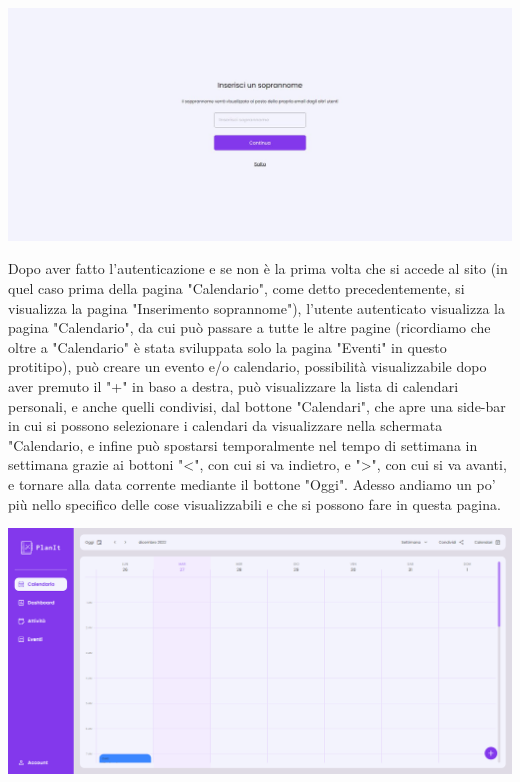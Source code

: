 \begin{center}
    \includegraphics[width=1\textwidth, height=0.3\textheight]{img/png/FrontEnd/InserimentoSoprannome.jpg}
\end{center}

Dopo aver fatto l'autenticazione e se non è la prima volta che si accede al sito (in quel caso prima della pagina "Calendario", come detto precedentemente, si visualizza la pagina "Inserimento soprannome"), l'utente autenticato visualizza la pagina "Calendario", da cui può passare a tutte le altre pagine (ricordiamo che oltre a "Calendario" è stata sviluppata solo la pagina "Eventi" in questo protitipo), può creare un evento  e/o calendario, possibilità visualizzabile dopo aver premuto il "+" in baso a destra, può visualizzare la lista di calendari personali, e anche quelli condivisi, dal bottone "Calendari", che apre una side-bar in cui si possono selezionare i calendari da visualizzare nella schermata "Calendario, e infine può spostarsi temporalmente nel tempo di settimana in settimana grazie ai bottoni "<", con cui si va indietro, e ">", con cui si va avanti, e tornare alla data corrente mediante il bottone "Oggi". Adesso andiamo un po' più nello specifico delle cose visualizzabili e che si possono fare in questa pagina.

\begin{center}
    \includegraphics[width=1\textwidth, height=0.3\textheight]{img/png/FrontEnd/Calendario/schermata_calendario.png}
\end{center}

